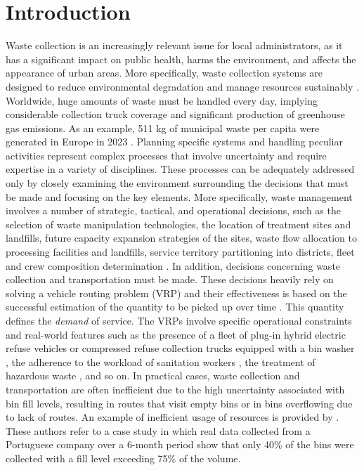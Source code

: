 \documentclass[authoryear,preprint,12pt]{elsarticle}
\begin{document}
\section{Introduction}\label{intro}
Waste collection is an increasingly relevant issue for local administrators, as it has a significant impact on public health, harms the environment, and affects the appearance of urban areas. More specifically, waste collection systems are designed to reduce environmental degradation and manage resources sustainably \citep{Wei2025}. Worldwide, huge amounts of waste must be handled every day, implying considerable collection truck coverage and significant production of greenhouse gas emissions. As an example, 511 kg of municipal waste per capita were generated in Europe in 2023 \citep{Eurostat2025}.   
Planning specific systems and handling peculiar activities represent complex processes that involve uncertainty and require expertise in a variety of disciplines. These processes can be adequately addressed only by closely examining the environment surrounding the decisions that must be made and focusing on the key elements.
More specifically, waste management involves a number of strategic, tactical, and operational decisions, such as the selection of waste manipulation technologies, the location of treatment sites and landfills, future capacity expansion strategies of the sites, waste flow allocation to processing facilities and landfills, service territory partitioning into districts, fleet and crew composition determination \citep{Ghiani2014}. In addition, decisions concerning waste collection and transportation must be made. These decisions heavily rely on solving a vehicle routing problem (VRP) and their effectiveness is based on the successful estimation of the quantity to be picked up over time \citep{Hess2024}. This quantity defines the \textit{demand} of service. The VRPs involve specific operational constraints and real-world features such as the presence of a fleet of plug-in hybrid electric refuse vehicles \citep{Masmoudi2022} or compressed refuse collection trucks equipped with a bin washer \citep{Masmoudi2024}, the adherence to the workload of sanitation workers \citep{Zhang2025}, the treatment of hazardous waste \citep{Hu2002}, and so on.  
%
In practical cases, waste collection and transportation are often inefficient due to the high uncertainty associated with bin fill levels, resulting in routes that visit empty bins or in bins overflowing due to lack of routes. An example of inefficient usage of resources is provided by \cite{Ramos2018}. These authors refer to a case study in which real data collected from a Portuguese company over a 6-month period show that only 40\% of the bins were collected with a fill level exceeding 75\% of the volume. 
\end{document}
